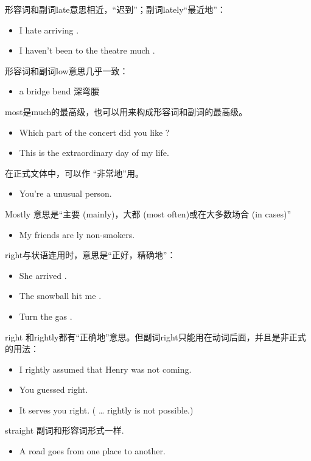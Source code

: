 形容词和副词late意思相近，“迟到”；副词lately“最近地”：
\begin{itemize}
\item I hate arriving .

\item I haven't been to the theatre much .
\end{itemize}

形容词和副词low意思几乎一致：
\begin{itemize}
\item a  bridge \qquad bend  深弯腰
\end{itemize}

most是much的最高级，也可以用来构成形容词和副词的最高级。
\begin{itemize}
\item Which part of the concert did you like ?
\item This is the  extraordinary day of my life.
\end{itemize}
在正式文体中，可以作
“非常地”用。
\begin{itemize}
\item You're a  unusual person.
\end{itemize}
Mostly 意思是“主要 (mainly)，大都 (most often)或在大多数场合 (in  cases)”
\begin{itemize}
\item My friends are ly non-smokers.
\end{itemize}


right与状语连用时，意思是“正好，精确地”：
\begin{itemize}
\item She arrived  .
\item The snowball hit me  .
\item Turn the gas  .
\end{itemize}
right 和rightly都有“正确地”意思。但副词right只能用在动词后面，并且是非正式
的用法：
\begin{itemize}
\item I rightly assumed that Henry was not coming.
\item You guessed right.
\item It serves you right. ( … rightly is not possible.)
\end{itemize}

straight 副词和形容词形式一样.
\begin{itemize}
\item A  road goes  from one place to another.
\end{itemize}

